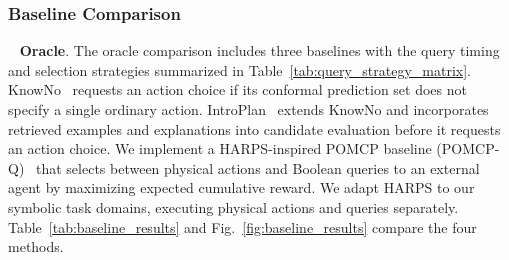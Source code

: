 \subsubsection{Baseline Comparison}~\label{exp:sys_baseline}
\noindent\textbf{Oracle}. The oracle comparison includes three baselines with the query timing and selection strategies summarized in Table~\ref{tab:query_strategy_matrix}. KnowNo~\citep{ren2023robots} requests an action choice if its conformal prediction set does not specify a single ordinary action. IntroPlan~\citep{liang2024introspective} extends KnowNo and incorporates retrieved examples and explanations into candidate evaluation before it requests an action choice. We implement a HARPS-inspired POMCP baseline (POMCP-Q)~\citep{burks2023harps} that selects between physical actions and Boolean queries to an external agent by maximizing expected cumulative reward. We adapt HARPS to our symbolic task domains, executing physical actions and queries separately. Table~\ref{tab:baseline_results} and Fig.~\ref{fig:baseline_results} compare the four methods.


